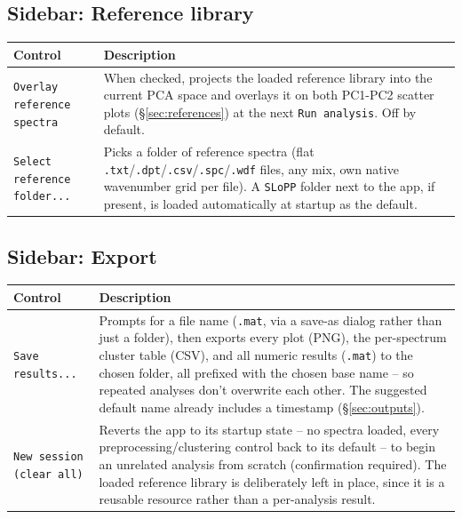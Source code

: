 \documentclass[11pt,a4paper]{article}
\makeatletter
\newcommand{\code}[1]{\texttt{#1}}
\newenvironment{argtabletwo}[4]{%
  \begin{center}
  \renewcommand{\arraystretch}{1.25}
  \setlength{\dimen2}{\dimexpr\textwidth-#3-4\tabcolsep-2\arrayrulewidth\relax}
  \begin{tabular}{@{}p{#3}p{\dimen2}@{}}
  \toprule
  \textbf{#1} & \textbf{#2} \\
  \midrule
}{%
  \bottomrule
  \end{tabular}
  \end{center}
}
\makeatother
\begin{document}
\subsection{Sidebar: Reference library}
\label{sec:sidebar-references}
\begin{argtabletwo}{Control}{Description}{3.2cm}{X}
\code{Overlay reference spectra} & When checked, projects the loaded
reference library into the current PCA space and overlays it on both
PC1-PC2 scatter plots (\S\ref{sec:references}) at the next
\code{Run analysis}. Off by default. \\
\code{Select reference folder...} & Picks a folder of reference spectra
(flat \code{.txt}/\code{.dpt}/\code{.csv}/\code{.spc}/\code{.wdf} files,
any mix, own native wavenumber grid per file). A \code{SLoPP} folder next
to the app, if present, is loaded automatically at startup as the
default. \\
\end{argtabletwo}

\subsection{Sidebar: Export}
\begin{argtabletwo}{Control}{Description}{3.2cm}{X}
\code{Save results...} & Prompts for a file name (\code{.mat}, via a
save-as dialog rather than just a folder), then exports every plot (PNG),
the per-spectrum cluster table (CSV), and all numeric results
(\code{.mat}) to the chosen folder, all prefixed with the chosen base
name -- so repeated analyses don't overwrite each other. The suggested
default name already includes a timestamp (\S\ref{sec:outputs}). \\
\code{New session (clear all)} & Reverts the app to its startup state --
no spectra loaded, every preprocessing/clustering control back to its
default -- to begin an unrelated analysis from scratch (confirmation
required). The loaded reference library is deliberately left in place,
since it is a reusable resource rather than a per-analysis result. \\
\end{argtabletwo}

\end{document}
